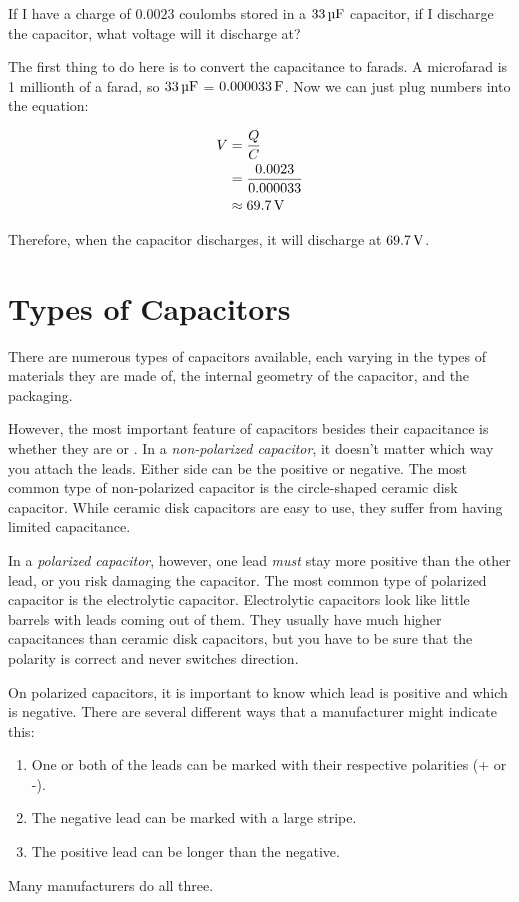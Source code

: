 \begin{exampleprob}
If I have a charge of $0.0023 \textrm{ coulombs}$ stored in a $33\,\si{\micro\farad}$ capacitor, if I discharge the capacitor, what voltage will it discharge at?

The first thing to do here is to convert the capacitance to farads.  A microfarad is 1 millionth of a farad, so $33\,\si{\micro\farad}$ = $0.000033\,\si{\farad}$.
Now we can just plug numbers into the equation:

\begin{align*}
V &= \frac{Q}{C} \\
  &= \frac{0.0023}{0.000033} \\
  &\approx 69.7\,\si{\volt}
\end{align*}

Therefore, when the capacitor discharges, it will discharge at $69.7\,\si{\volt}$.

\end{exampleprob}

\section{Types of Capacitors}

There are numerous types of capacitors available, each varying in the types of materials they are made of, the internal geometry of the capacitor, and the packaging.


However, the most important feature of capacitors besides their capacitance is whether they are  or .
In a \emph{non-polarized capacitor}, it doesn't matter which way you attach the leads.
Either side can be the positive or negative.
The most common type of non-polarized capacitor is the circle-shaped ceramic disk capacitor.
While ceramic disk capacitors are easy to use, they suffer from having limited capacitance.

In a \emph{polarized capacitor}, however, one lead \emph{must} stay more positive than the other lead, or you risk damaging the capacitor.
The most common type of polarized capacitor is the electrolytic capacitor.
Electrolytic capacitors look like little barrels with leads coming out of them.
They usually have much higher capacitances than ceramic disk capacitors, but you have to be sure that the polarity is correct and never switches direction.

On polarized capacitors, it is important to know which lead is positive and which is negative.  
There are several different ways that a manufacturer might indicate this:
\begin{enumerate}
\item One or both of the leads can be marked with their respective polarities (+ or -).
\item The negative lead can be marked with a large stripe.  
\item The positive lead can be longer than the negative.
\end{enumerate}
Many manufacturers do all three.

